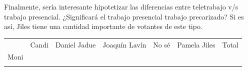 \documentclass[
]{article}
\begin{document}
Finalmente, sería interesante hipotetizar las diferencias entre
teletrabajo v/s trabajo presencial. ¿Significará el trabajo presencial
trabajo precarizado? Si es así, Jiles tiene una cantidad importante de
votantes de este tipo.

\begin{longtable}[]{@{}rrrrrrr@{}}
\toprule
\endhead
\begin{minipage}[t]{0.13\columnwidth}\raggedleft
\strut
\end{minipage} & \begin{minipage}[t]{0.05\columnwidth}\raggedleft
Candi\strut
\end{minipage} & \begin{minipage}[t]{0.13\columnwidth}\raggedleft
Daniel Jadue\strut
\end{minipage} & \begin{minipage}[t]{0.12\columnwidth}\raggedleft
Joaquín Lavín\strut
\end{minipage} & \begin{minipage}[t]{0.13\columnwidth}\raggedleft
No sé\strut
\end{minipage} & \begin{minipage}[t]{0.13\columnwidth}\raggedleft
Pamela Jiles\strut
\end{minipage} & \begin{minipage}[t]{0.13\columnwidth}\raggedleft
Total\strut
\end{minipage}\tabularnewline
\begin{minipage}[t]{0.13\columnwidth}\raggedleft
Moni\strut
\end{minipage} & \begin{minipage}[t]{0.05\columnwidth}\raggedleft
\strut
\end{minipage} & \begin{minipage}[t]{0.13\columnwidth}\raggedleft
\strut
\end{minipage} & \begin{minipage}[t]{0.12\columnwidth}\raggedleft
\strut
\end{minipage} & \begin{minipage}[t]{0.13\columnwidth}\raggedleft
\strut
\end{minipage} & \begin{minipage}[t]{0.13\columnwidth}\raggedleft
\strut
\end{minipage} & \begin{minipage}[t]{0.13\columnwidth}\raggedleft
\strut
\end{minipage}\tabularnewline
\begin{minipage}[t]{0.13\columnwidth}\raggedleft

\end{minipage}
\end{longtable}
\end{document}
